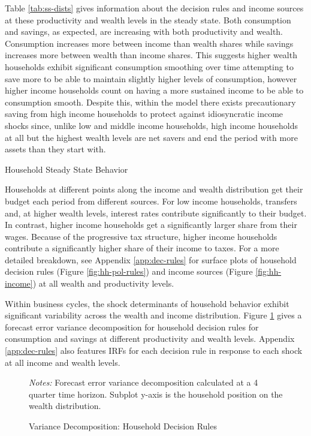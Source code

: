 Table \ref{tab:ss-dists} gives information about the decision rules and income sources at these productivity and wealth levels in the steady state. Both consumption and savings, as expected, are increasing with both productivity and wealth. Consumption increases more between income than wealth shares while savings increases more between wealth than income shares. This suggests higher wealth households exhibit significant consumption smoothing over time attempting to save more to be able to maintain slightly higher levels of consumption, however higher income households count on having a more sustained income to be able to consumption smooth. Despite this, within the model there exists precautionary saving from high income households to protect against idiosyncratic income shocks since, unlike low and middle income households, high income households at all but the highest wealth levels are net savers and end the period with more assets than they start with.

\begin{table}[t]
    \centering
    \caption{Household Steady State Behavior}
    
    \label{tab:ss-dists}
\end{table}

Households at different points along the income and wealth distribution get their budget each period from different sources. For low income households, transfers and, at higher wealth levels, interest rates contribute significantly to their budget. In contrast, higher income households get a significantly larger share from their wages. Because of the progressive tax structure, higher income households contribute a significantly higher share of their income to taxes. For a more detailed breakdown, see Appendix \ref{app:dec-rules} for surface plots of household decision rules (Figure \ref{fig:hh-pol-rules}) and income sources (Figure \ref{fig:hh-income}) at all wealth and productivity levels.

Within business cycles, the shock determinants of household behavior exhibit significant variability across the wealth and income distribution. Figure \ref{fig:hh-var-decomp} gives a forecast error variance decomposition for household decision rules for consumption and savings at different productivity and wealth levels. Appendix \ref{app:dec-rules} also features IRFs for each decision rule in response to each shock at all income and wealth levels. 

\begin{figure}[t!]  %
    \centering
    \caption{Variance Decomposition: Household Decision Rules}
    
    {\scriptsize \textit{Notes:} Forecast error variance decomposition calculated at a 4 quarter time horizon. Subplot y-axis is the household position on the wealth distribution.}
    \label{fig:hh-var-decomp}
\end{figure}

